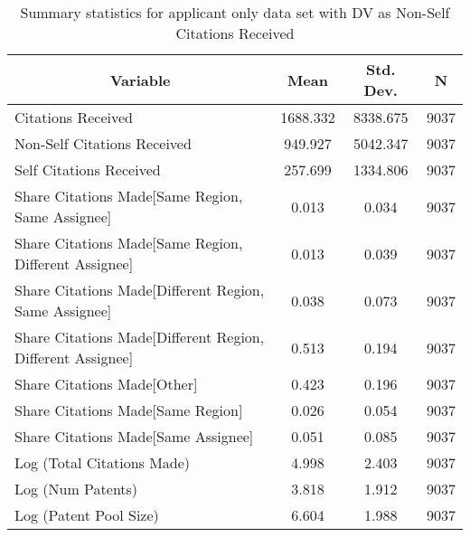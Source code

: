 
\begin{table}[htbp]\centering \caption{Summary statistics for applicant only data set with DV as Non-Self Citations Received \label{a.nsummary}}
\scriptsize
\singlespacing
\begin{tabular}{l c c  c}\hline\hline
\multicolumn{1}{c}{\textbf{Variable}} & \textbf{Mean}
 & \textbf{Std. Dev.} & \textbf{N}\\ \hline
Citations Received & 1688.332 & 8338.675  & 9037\\
Non-Self Citations Received & 949.927 & 5042.347  & 9037\\
Self Citations Received & 257.699 & 1334.806  & 9037\\
Share Citations Made[Same Region, Same Assignee] & 0.013 & 0.034  & 9037\\
Share Citations Made[Same Region, Different Assignee] & 0.013 & 0.039  & 9037\\
Share Citations Made[Different Region, Same Assignee] & 0.038 & 0.073  & 9037\\
Share Citations Made[Different Region, Different Assignee] & 0.513 & 0.194  & 9037\\
Share Citations Made[Other] & 0.423 & 0.196  & 9037\\
Share Citations Made[Same Region] & 0.026 & 0.054  & 9037\\
Share Citations Made[Same Assignee] & 0.051 & 0.085  & 9037\\
Log (Total Citations Made) & 4.998 & 2.403  & 9037\\
Log (Num Patents) & 3.818 & 1.912  & 9037\\
Log (Patent Pool Size) & 6.604 & 1.988  & 9037\\
\hline\end{tabular}
\end{table}

